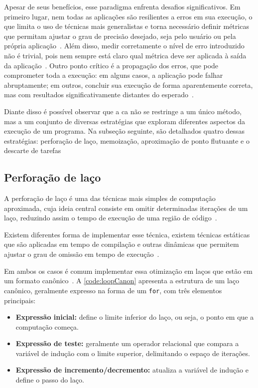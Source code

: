 Apesar de seus benefícios, esse paradigma enfrenta desafios significativos. Em primeiro lugar, nem todas as aplicações são resilientes a erros em sua execução, o que limita o uso de técnicas mais generalistas e torna necessário definir métricas que permitam ajustar o grau de precisão desejado, seja pelo usuário ou pela própria aplicação~\cite{mittal2016}. Além disso, medir corretamente o nível de erro introduzido não é trivial, pois nem sempre está claro qual métrica deve ser aplicada à saída da aplicação~\cite{felzmann2021}. Outro ponto crítico é a propagação dos erros, que pode comprometer toda a execução: em alguns casos, a aplicação pode falhar abruptamente; em outros, concluir sua execução de forma aparentemente correta, mas com resultados significativamente distantes do esperado~\cite{fabricio2020}.

Diante disso é possível observar que a \gls{ca} não se restringe a um único método, mas a um conjunto de diversas estratégias que exploram diferentes aspectos da execução de um programa. Na subseção seguinte, são detalhados quatro dessas estratégias: perforação de laço, memoização, aproximação de ponto flutuante e o descarte de tarefas

\subsection{Perforação de laço}\label{subsec:perfLaco}

A perforação de laço é uma das técnicas mais simples de computação aproximada, cuja ideia central consiste em omitir determinadas iterações de um laço, reduzindo assim o tempo de execução de uma região de código~\cite{sidiroglou2011}.

Existem diferentes forma de implementar esse técnica, existem técnicas estáticas que são aplicadas em tempo de compilação e outras dinâmicas que permitem ajustar o grau de omissão em tempo de execução~\cite{li2018}.

Em ambos os casos é comum implementar essa otimização em laços que estão em um formato canônico~\cite{openmp2018}. A \autoref{code:loopCanon} apresenta a estrutura de um laço canônico, geralmente expresso na forma de um \texttt{for}, com três elementos principais:

\begin{itemize}
    \item \textbf{Expressão inicial:} define o limite inferior do laço, ou seja, o ponto em que a computação começa.
    \item \textbf{Expressão de teste:} geralmente um operador relacional que compara a variável de indução com o limite superior, delimitando o espaço de iterações.
    \item \textbf{Expressão de incremento/decremento:} atualiza a variável de indução e define o passo do laço.
\end{itemize}

